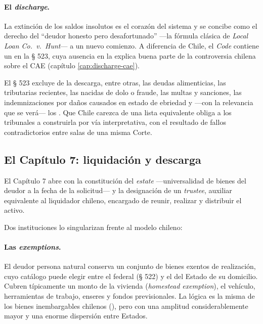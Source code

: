 \paragraph{El \emph{discharge}.} La extinción de los saldos insolutos es el corazón del sistema y
se concibe como el derecho del \enquote{deudor honesto pero desafortunado} ---la fórmula clásica
de \emph{Local Loan Co.\ v.\ Hunt}--- a un nuevo comienzo. A diferencia de Chile, el \emph{Code}
contiene un  en la § 523, cuya ausencia
en la \LIR{} explica buena parte de la controversia chilena sobre el CAE (capítulo
\ref{cap:discharge-cae}).

\begin{alerta}
El § 523 excluye de la descarga, entre otras, las deudas alimenticias, las tributarias recientes,
las nacidas de dolo o fraude, las multas y sanciones, las indemnizaciones por daños causados en
estado de ebriedad y ---con la relevancia que se verá--- los . Que
Chile carezca de una lista equivalente obliga a los tribunales a construirla por vía
interpretativa, con el resultado de fallos contradictorios entre salas de una misma Corte.
\end{alerta}

\bloqueNormativo

\subsection{El Capítulo 7: liquidación y descarga}

El Capítulo 7 abre con la constitución del \emph{estate} ---universalidad de bienes del deudor a la
fecha de la solicitud--- y la designación de un \emph{trustee}, auxiliar equivalente al liquidador
chileno, encargado de reunir, realizar y distribuir el activo.

Dos instituciones lo singularizan frente al modelo chileno:

\paragraph{Las \emph{exemptions}.} El deudor persona natural conserva un conjunto de bienes exentos
de realización, cuyo catálogo puede elegir entre el federal (§ 522) y el del Estado de su
domicilio. Cubren típicamente un monto de la vivienda (\emph{homestead exemption}), el vehículo,
herramientas de trabajo, enseres y fondos previsionales. La lógica es la misma de los bienes
inembargables chilenos (), pero con una amplitud considerablemente mayor y una enorme
dispersión entre Estados.

